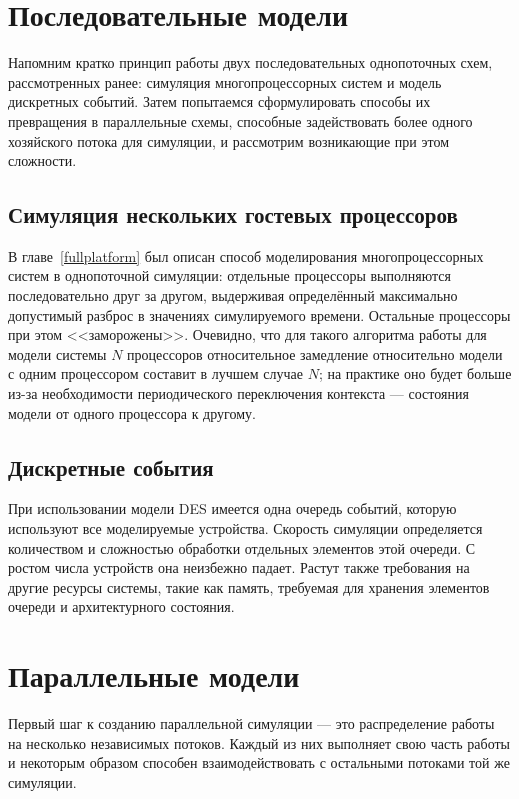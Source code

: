 \section{Последовательные модели}

Напомним кратко принцип работы двух последовательных однопоточных схем, рассмотренных ранее: симуляция многопроцессорных систем и модель дискретных событий. Затем попытаемся сформулировать способы их превращения в параллельные схемы, способные задействовать более одного хозяйского потока для симуляции, и рассмотрим возникающие при этом сложности.

\subsection{Симуляция нескольких гостевых процессоров}

В главе~\ref{fullplatform} был описан способ моделирования многопроцессорных систем в однопоточной симуляции: отдельные процессоры выполняются последовательно друг за другом, выдерживая определённый максимально допустимый разброс в значениях симулируемого времени. Остальные процессоры при этом <<заморожены>>. Очевидно, что для такого алгоритма работы для модели системы $N$ процессоров относительное замедление относительно модели с одним процессором составит в лучшем случае $N$; на практике оно будет больше из-за необходимости периодического переключения контекста --- состояния модели от одного процессора к другому.

\subsection{Дискретные события}

При использовании модели DES имеется одна очередь событий, которую используют все моделируемые устройства. Скорость симуляции определяется количеством и сложностью обработки отдельных элементов этой очереди. С ростом числа устройств она неизбежно падает. Растут также требования на другие ресурсы системы, такие как память, требуемая для хранения элементов очереди и архитектурного состояния.

\section{Параллельные модели}

Первый шаг к созданию параллельной симуляции --- это распределение работы на несколько независимых потоков. Каждый из них выполняет свою часть работы и некоторым образом способен взаимодействовать с остальными потоками той же симуляции. 

